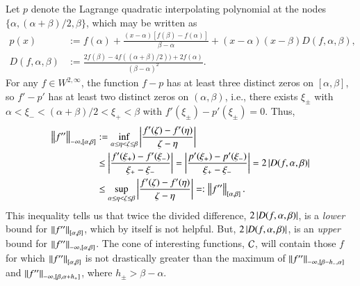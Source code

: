 \documentclass[review]{elsarticle}
\theoremstyle{definition}
\renewcommand{\cw}{W}
\begin{document}
Let $p$ denote the Lagrange quadratic interpolating polynomial at the nodes
$\{\alpha, (\alpha + \beta)/2, \beta\}$, which may be written as
\begin{align}
\nonumber
   p(x) & := f(\alpha) + \frac{(x-\alpha)[f(\beta) - f(\alpha)]}{\beta - \alpha}  +
   (x-\alpha)(x-\beta) D(f,\alpha,\beta),
\\ D(f,\alpha,\beta) &:= \frac{2f(\beta) - 4f((\alpha + \beta)/2))
	+ 2f(\alpha)}{(\beta - \alpha)^2}. \label{divdiffdef}
\end{align}
For any $f \in \cw^{2,\infty}$, the function $f - p$ has at least three distinct
zeros on $[\alpha,\beta]$, so $f' - p'$ has at least two distinct zeros on
$(\alpha,\beta)$, i.e., there exists $\xi_\pm$ with $\alpha < \xi_- < (\alpha +
\beta)/2 < \xi_+ < \beta$ with $f'(\xi_\pm) - p'(\xi_{\pm}) = 0$. Thus,
\begin{align} \label{NDDbdm}
     \norm[-\infty,{[\alpha,\beta]}]{f''}
   & := \inf_{\alpha \le \eta < \zeta \le \beta} \abs{\frac{f'(\zeta) - f'(\eta)}{\zeta - \eta}}
   \nonumber
\\ & \le \abs{\frac{f'(\xi_+) - f'(\xi_-)}{\xi_+ - \xi_-}}
   = \abs{\frac{p'(\xi_+) - p'(\xi_-)}{\xi_+ - \xi_-}} = 2 \abs{D(f,\alpha,\beta)}  \nonumber
\\ & \le \sup_{\alpha \le \eta < \zeta \le \beta} \abs{\frac{f'(\zeta) - f'(\eta)}{\zeta - \eta}}
=: \norm[{[\alpha,\beta]}]{f''}.
\end{align}
This inequality tells us that twice the divided difference,
$2\abs{D(f,\alpha,\beta)}$, is a \emph{lower} bound for
$\norm[{[\alpha,\beta]}]{f''}$, which by itself is not helpful. But,
$2\abs{D(f,\alpha,\beta)}$, is an \emph{upper} bound for
$\norm[-\infty,{[\alpha,\beta]}]{f''}$. The cone of interesting functions,
$\cc$, will contain those $f$ for which $\norm[{[\alpha,\beta]}]{f''}$ is not
drastically greater than the maximum of $\norm[-\infty,{[\beta - h_-,
\alpha]}]{f''}$ and $\norm[-\infty,{[\beta, \alpha+ h_+]}]{f''}$, where $h_{\pm} > \beta -
\alpha$.
\end{document}
